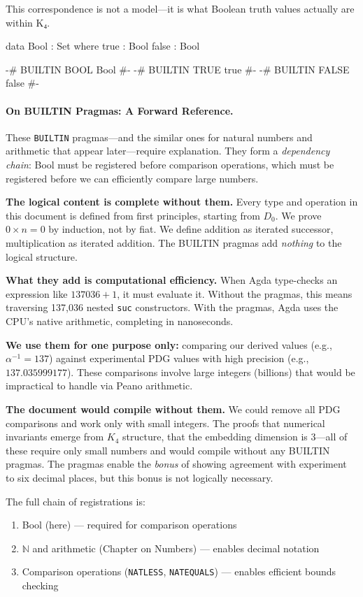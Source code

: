 \documentclass[11pt,a4paper]{book}
\begin{document}
This correspondence is not a model—it is what Boolean truth values actually are within K₄.

\begin{code}
data Bool : Set where
  true  : Bool
  false : Bool

{-# BUILTIN BOOL  Bool  #-}
{-# BUILTIN TRUE  true  #-}
{-# BUILTIN FALSE false #-}
\end{code}

\paragraph{On BUILTIN Pragmas: A Forward Reference.}
These \texttt{BUILTIN} pragmas---and the similar ones for natural numbers and arithmetic 
that appear later---require explanation. They form a \emph{dependency chain}: Bool must 
be registered before comparison operations, which must be registered before we can 
efficiently compare large numbers.

\textbf{The logical content is complete without them.} Every type and operation in this 
document is defined from first principles, starting from $D_0$. We prove $0 \times n = 0$ 
by induction, not by fiat. We define addition as iterated successor, multiplication as 
iterated addition. The BUILTIN pragmas add \emph{nothing} to the logical structure.

\textbf{What they add is computational efficiency.} When Agda type-checks an expression 
like $137036 + 1$, it must evaluate it. Without the pragmas, this means traversing 137,036 
nested \texttt{suc} constructors. With the pragmas, Agda uses the CPU's native arithmetic, 
completing in nanoseconds.

\textbf{We use them for one purpose only:} comparing our derived values (e.g., $\alpha^{-1} = 137$) 
against experimental PDG values with high precision (e.g., $137.035999177$). These comparisons 
involve large integers (billions) that would be impractical to handle via Peano arithmetic.

\textbf{The document would compile without them.} We could remove all PDG comparisons and 
work only with small integers. The proofs that numerical invariants emerge from $K_4$ structure, 
that the embedding dimension is $3$---all of these require only small numbers and would 
compile without any BUILTIN pragmas. The pragmas enable the \emph{bonus} of showing agreement 
with experiment to six decimal places, but this bonus is not logically necessary.

The full chain of registrations is:
\begin{enumerate}
\item Bool (here) --- required for comparison operations
\item $\mathbb{N}$ and arithmetic (Chapter on Numbers) --- enables decimal notation
\item Comparison operations (\texttt{NATLESS}, \texttt{NATEQUALS}) --- enables efficient bounds checking
\end{enumerate}
\end{document}
